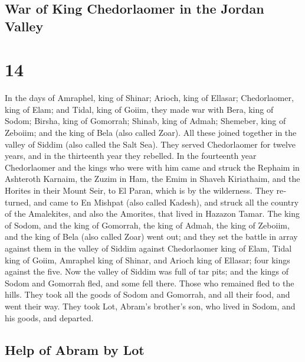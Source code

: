 \begin{paracol}{2}
\switchcolumn
\begin{otherlanguage}{english}

\hypertarget{war-of-king-chedorlaomer-in-the-jordan-valley}{%
\subsection{War of King Chedorlaomer in the Jordan
Valley}\label{war-of-king-chedorlaomer-in-the-jordan-valley}}

\hypertarget{section-27}{%
\section{14}\label{section-27}}

 In the days of Amraphel, king of Shinar; Arioch, king of
Ellasar; Chedorlaomer, king of Elam; and Tidal, king of Goiim,
 they made war with Bera, king of Sodom; Birsha, king of
Gomorrah; Shinab, king of Admah; Shemeber, king of Zeboiim; and the king
of Bela (also called Zoar).  All these joined together in
the valley of Siddim (also called the Salt Sea).  They
served Chedorlaomer for twelve years, and in the thirteenth year they
rebelled.  In the fourteenth year Chedorlaomer and the
kings who were with him came and struck the Rephaim in Ashteroth
Karnaim, the Zuzim in Ham, the Emim in Shaveh Kiriathaim, 
and the Horites in their Mount Seir, to El Paran, which is by the
wilderness.  They returned, and came to En Mishpat (also
called Kadesh), and struck all the country of the Amalekites, and also
the Amorites, that lived in Hazazon Tamar.  The king of
Sodom, and the king of Gomorrah, the king of Admah, the king of Zeboiim,
and the king of Bela (also called Zoar) went out; and they set the
battle in array against them in the valley of Siddim 
against Chedorlaomer king of Elam, Tidal king of Goiim, Amraphel king of
Shinar, and Arioch king of Ellasar; four kings against the five.
 Now the valley of Siddim was full of tar pits; and the
kings of Sodom and Gomorrah fled, and some fell there. Those who
remained fled to the hills.  They took all the goods of
Sodom and Gomorrah, and all their food, and went their way.
 They took Lot, Abram's brother's son, who lived in
Sodom, and his goods, and departed.

\hypertarget{help-of-abram-by-lot}{%
\subsection{Help of Abram by Lot}\label{help-of-abram-by-lot}}


\end{otherlanguage}
\end{paracol}

